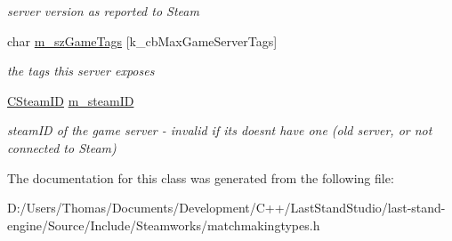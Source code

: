 \begin{DoxyCompactItemize}
\begin{DoxyCompactList}\small\item\em server version as reported to Steam \end{DoxyCompactList}\item 
\hypertarget{classgameserveritem__t_a1372815e9fb666d741ea23b66509d91f}{}char \hyperlink{classgameserveritem__t_a1372815e9fb666d741ea23b66509d91f}{m\+\_\+sz\+Game\+Tags} \mbox{[}k\+\_\+cb\+Max\+Game\+Server\+Tags\mbox{]}\label{classgameserveritem__t_a1372815e9fb666d741ea23b66509d91f}

\begin{DoxyCompactList}\small\item\em the tags this server exposes \end{DoxyCompactList}\item 
\hypertarget{classgameserveritem__t_a2eae92d0752c4482bcd149a84bc59d02}{}\hyperlink{classCSteamID}{C\+Steam\+I\+D} \hyperlink{classgameserveritem__t_a2eae92d0752c4482bcd149a84bc59d02}{m\+\_\+steam\+I\+D}\label{classgameserveritem__t_a2eae92d0752c4482bcd149a84bc59d02}

\begin{DoxyCompactList}\small\item\em steam\+I\+D of the game server -\/ invalid if it\textquotesingle{}s doesn\textquotesingle{}t have one (old server, or not connected to Steam) \end{DoxyCompactList}\end{DoxyCompactItemize}


The documentation for this class was generated from the following file\+:\begin{DoxyCompactItemize}
\item 
D\+:/\+Users/\+Thomas/\+Documents/\+Development/\+C++/\+Last\+Stand\+Studio/last-\/stand-\/engine/\+Source/\+Include/\+Steamworks/matchmakingtypes.\+h\end{DoxyCompactItemize}
